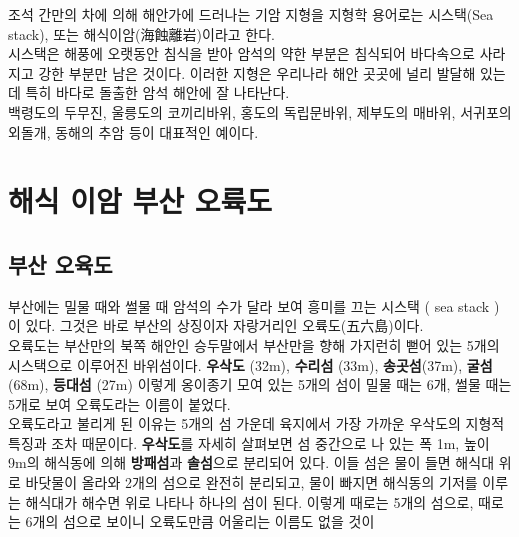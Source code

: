 \documentclass[12pt, a4paper, twoside]{book}
\begin{document}
	

				조석 간만의 차에 의해 해안가에 드러나는 기암 지형을 지형학 용어로는 시스택(Sea stack), 또는 해식이암(海蝕離岩)이라고 한다. \\
				
				시스택은 해풍에 오랫동안 침식을 받아 암석의 약한 부분은 침식되어 바다속으로 사라지고 강한 부분만 남은 것이다. 이러한 지형은 우리나라 해안 곳곳에 널리 발달해 있는데 특히 바다로 돌출한 암석 해안에 잘 나타난다. \\
				
				백령도의 두무진, 울릉도의 코끼리바위, 홍도의 독립문바위, 제부도의 매바위, 서귀포의 외돌개, 동해의 추암 등이 대표적인 예이다.





	\clearpage
	\section{해식 이암 부산 오륙도}
	

	\subsection{	부산 오육도}
	

			부산에는 밀물 때와 썰물 때 암석의 수가 달라 보여 흥미를 끄는 시스택 ( sea stack )이 있다. 
			그것은 바로 부산의 상징이자 자랑거리인 오륙도(五六島)이다.  \\
			
			오륙도는 부산만의 북쪽 해안인 승두말에서 부산만을 향해 가지런히 뻗어 있는 5개의 시스택으로 이루어진 바위섬이다. 
			\textbf{우삭도} (32m), \textbf{수리섬} (33m), \textbf{송곳섬}(37m), \textbf{굴섬} (68m), \textbf{등대섬} (27m) 
			이렇게 옹이종기 모여 있는 5개의 섬이 밀물 때는 6개, 썰물 때는 5개로 보여 오륙도라는 이름이 붙었다. \\
			
			오륙도라고 불리게 된 이유는 5개의 섬 가운데 육지에서 가장 가까운 우삭도의 지형적 특징과 조차 때문이다. 
			\textbf{우삭도}를 자세히 살펴보면 섬 중간으로 나 있는 폭 1m, 높이 9m의 해식동에 의해 \textbf{방패섬}과 \textbf{솔섬}으로 분리되어 있다. 
			이들 섬은 물이 들면 해식대 위로 바닷물이 올라와 2개의 섬으로 완전히 분리되고, 물이 빠지면 해식동의 기저를 이루는 해식대가 해수면 위로 나타나 하나의 섬이 된다. 
			이렇게 때로는 5개의 섬으로, 때로는 6개의  섬으로 보이니 오륙도만큼 어울리는 이름도 없을 것이 \\
			
\end{document}
